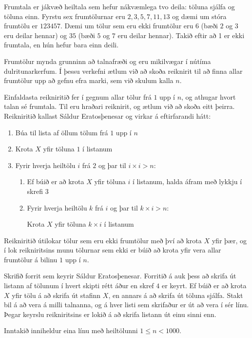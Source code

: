 
Frumtala er jákvæð heiltala sem hefur nákvæmlega tvo deila: töluna sjálfa og
töluna einn. Fyrstu sex frumtölurnar eru $2, 3, 5, 7, 11, 13$ og dæmi um stóra
frumtölu er $123457$. Dæmi um tölur sem eru ekki frumtölur eru $6$ (bæði $2$ og $3$ eru
deilar hennar) og $35$ (bæði $5$ og $7$ eru deilar hennar). Takið eftir að 1 er ekki
frumtala, en hún hefur bara einn deili.

Frumtölur mynda grunninn að talnafræði og eru mikilvægar í nútíma
dulritunarkerfum. Í þessu verkefni ætlum við að skoða reiknirit til að finna allar
frumtölur upp að gefnu efra marki, sem við skulum kalla $n$.

Einfaldasta reikniritið fer í gegnum allar tölur frá $1$ upp í $n$, og athugar
hvort talan sé frumtala. Til eru hraðari reiknirit, og ætlum við að skoða eitt
þeirra. Reikniritið kallast Sáldur Eratosþenesar og virkar
á eftirfarandi hátt:

\begin{enumerate}
    \item Búa til lista af öllum tölum frá $1$ upp í $n$
    \item Krota $X$ yfir töluna $1$ í listanum
    \item Fyrir hverja heiltölu $i$ frá $2$ og þar til $i\times i > n$:
        \begin{enumerate}
            \item Ef búið er að krota $X$ yfir töluna $i$ í listanum, halda áfram með lykkju í skrefi $3$
            \item Fyrir hverja heiltölu $k$ frá $i$ og þar til $k\times i > n$:
                \begin{enumerate}
                    Krota $X$ yfir töluna $k\times i$ í listanum
                \end{enumerate}
        \end{enumerate}
    
\end{enumerate}

Reikniritið útilokar tölur sem eru ekki frumtölur með því að krota $X$ yfir
þær, og í lok reikniritsins munu tölurnar sem ekki er búið að krota yfir vera
allar frumtölur á bilinu $1$ upp í $n$.

Skrifið forrit sem keyrir Sáldur Eratosþenesar. Forritið á auk þess að skrifa
út listann af tölunum í hvert skipti rétt áður en skref $4$ er keyrt. Ef búið
er að krota $X$ yfir tölu á að skrifa út stafinn $X$, en annars á að skrifa út
töluna sjálfa. Stakt bil á að vera á milli talnanna, og á hver listi sem
skrifaður er út að vera í sér línu. Þegar keyrslu reikniritsins er lokið á að
skrifa listann út einu sinni enn.

Inntakið inniheldur eina línu með heiltölunni $1 \leq n < 1000$.
